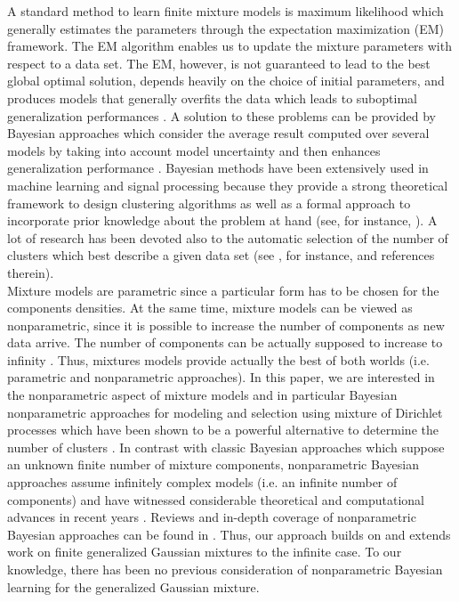 \documentclass[journal,10pt]{elsart}
\begin{document}
A standard method to learn finite mixture models is maximum likelihood which generally estimates the parameters through the expectation maximization (EM) framework. The EM algorithm enables us to update the mixture parameters with respect to a data set. The EM, however, is not guaranteed to lead to the best global optimal solution, depends heavily on the choice of initial parameters, and produces models that generally overfits the data which leads to suboptimal generalization performances \cite{Hebert1995,McLachlan2000}. A solution to these problems can be provided by Bayesian approaches which consider the average result computed over several models by taking into account model uncertainty \cite{Madigan1994,Draper1995,Rue1995} and then enhances generalization performance \cite{Ghosh2006,Robert2007}. Bayesian methods have been extensively used in machine learning and signal processing because they provide a strong theoretical framework to design clustering algorithms as well as a formal approach to incorporate prior knowledge about the problem at hand (see, for instance, \cite{Hebert1992,Godsill1997,Guebaly2011,DBLP:conf/annpr/ElguebalyB10}). A lot of research has been devoted also to the automatic selection of the number of clusters which best describe a given data set (see \cite{McLachlan2000,Stoica2004,BouguilaPAMI2007}, for instance, and references therein).\\
Mixture models are parametric since a particular form has to be chosen for the components densities. At the same time, mixture models can be viewed as nonparametric, since it is possible to increase the number of components as new data arrive. The number of components can be actually supposed to increase to infinity \cite{Edward2000}. Thus, mixtures models provide actually the best of both worlds (i.e. parametric and nonparametric approaches). In this paper, we are interested in the nonparametric aspect of mixture models and in particular Bayesian nonparametric approaches for modeling and selection using mixture of Dirichlet processes \cite{Ferguson1973} which have been shown to be a powerful alternative to determine the number of clusters \cite{West1995,Neal2000,Hoff2006}. In contrast with classic Bayesian approaches which suppose an unknown finite number of mixture components, nonparametric Bayesian approaches assume infinitely complex models (i.e. an infinite number of components) and have witnessed considerable theoretical and computational advances in recent years \cite{Edward2000,Neal2000,Regazzini2002,Guglielmi2002,Rodriguez2008,BouguilaMLSP2008,BouguilaIEEETNN2010,DBLP:conf/iciar/ElguebalyB11}. Reviews and in-depth coverage of nonparametric Bayesian approaches can be found in \cite{Gelfand2002,Ghosh2003}. Thus, our approach builds on and extends work on finite generalized Gaussian mixtures \cite{Allili2010} to the infinite case. To our knowledge, there has been no previous consideration of nonparametric Bayesian learning for the generalized Gaussian mixture.\\
\end{document}
